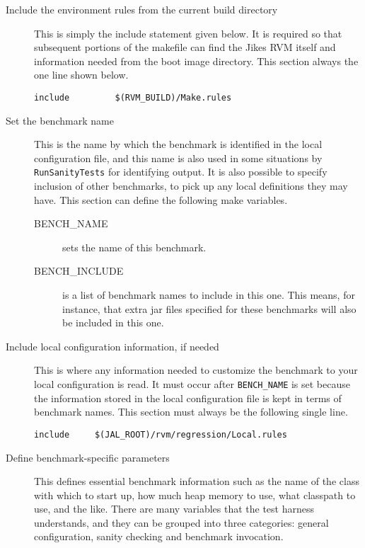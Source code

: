 \begin{description}
\item[Include the environment rules from the current build directory]
This is simply the include statement given below.  It is required so
that subsequent portions of the makefile can find the Jikes RVM itself
and information needed from the boot image directory.  This section
always the one line shown below.
\begin{verbatim}
include         $(RVM_BUILD)/Make.rules
\end{verbatim}

\item[Set the benchmark name] This is the name by which the benchmark
is identified in the local configuration file, and this name is also
used in some situations by {\tt{RunSanityTests}} for identifying
output.  It is also possible to specify inclusion of other benchmarks,
to pick up any local definitions they may have.  This section can
define the following make variables.
\begin{description}
\item[BENCH\_NAME] sets the name of this benchmark.  
\item[BENCH\_INCLUDE] is a list of benchmark names to include in this
one.  This means, for instance, that extra jar files specified for
these benchmarks will also be included in this one.
\end{description}

\item[Include local configuration information, if needed] This is
where any information needed to customize the benchmark to your local
configuration is read.  It must occur after {\tt{BENCH\_NAME}} is set
because the information stored in the local configuration file is kept
in terms of benchmark names.  This section must always be the
following single line.
\begin{verbatim}
include		$(JAL_ROOT)/rvm/regression/Local.rules
\end{verbatim}

\item[Define benchmark-specific parameters]  This defines essential
benchmark information such as the name of the class with which to
start up, how much heap memory to use, what classpath to use, and the
like.  There are many variables that the test harness understands, and
they can be grouped into three categories: general configuration,
sanity checking and benchmark invocation.


\end{description}
